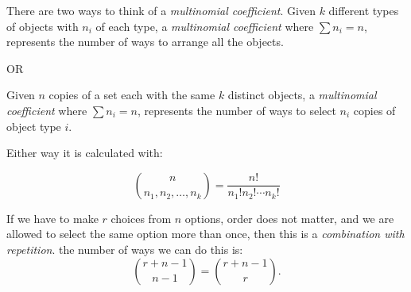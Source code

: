 \begin{defn} 
    There are two ways to think of a \emph{multinomial coefficient}. Given \(k\) different types of objects with \(n_i\) of each type, a \emph{multinomial coefficient} where \(\sum n_i=n\), represents the number of ways to arrange all the objects.
    \begin{center}
        OR
    \end{center}
    Given \(n\) copies of a set each with the same \(k\) distinct objects, a \emph{multinomial coefficient} where \(\sum n_i=n\), represents the number of ways to select \(n_i\) copies of object type \(i\).\vspace{\baselineskip}

    Either way it is calculated with:
    
    \[\binom{n}{n_1,n_2,\ldots,n_k}=\frac{n!}{n_1!n_2!\cdots n_k!}\]
    
\end{defn}



\begin{thm}\label{thm:comb_rep}
    If we have to make \(r\) choices from \(n\) options, order does not matter, and we are allowed to select the same option more than once, then this is a \emph{combination with repetition}.  the number of ways we can do this is:
    \[\binom{r+n-1}{n-1}=\binom{r+n-1}{r}.\]
\end{thm}

